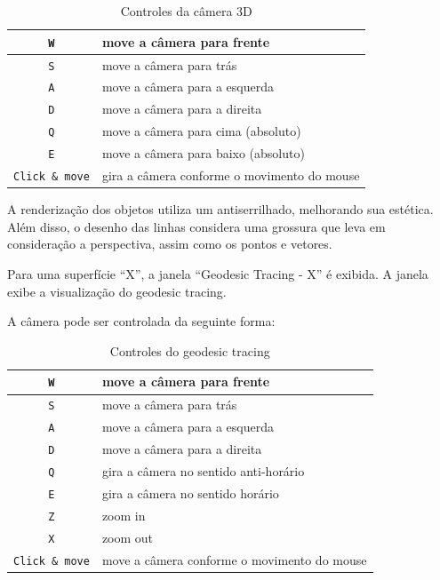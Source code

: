 \begin{table}[ht]
\caption{Controles da câmera 3D}
\label{camctrl}
\begin{centering}
\begin{tabularx}{\textwidth}{||c|X||}
    \hline
    \texttt{W} & move a câmera para frente \\
    \hline
    \texttt{S} & move a câmera para trás \\
    \hline
    \texttt{A} & move a câmera para a esquerda \\
    \hline
    \texttt{D} & move a câmera para a direita \\
    \hline
    \texttt{Q} & move a câmera para cima (absoluto) \\
    \hline
    \texttt{E} & move a câmera para baixo (absoluto) \\
    \hline
    \texttt{Click \& move} & gira a câmera conforme o movimento do mouse \\
    \hline
\end{tabularx}
\end{centering}
\end{table}

A renderização dos objetos utiliza um antiserrilhado, melhorando sua estética.
Além disso, o desenho das linhas considera uma grossura que leva
em consideração a perspectiva, assim como os pontos e vetores.

Para uma superfície ``X'', a janela ``Geodesic Tracing - X'' é exibida.
A janela exibe a visualização do geodesic tracing.

A câmera pode ser controlada da seguinte forma:

\begin{table}[ht]
\caption{Controles do geodesic tracing}
\label{gtctrl}
\begin{centering}
\begin{tabularx}{\textwidth}{||c|X||}
    \hline
    \texttt{W} & move a câmera para frente \\ 
    \hline
    \texttt{S} & move a câmera para trás \\
    \hline
    \texttt{A} & move a câmera para a esquerda \\
    \hline
    \texttt{D} & move a câmera para a direita \\
    \hline
    \texttt{Q} & gira a câmera no sentido anti-horário \\
    \hline
    \texttt{E} & gira a câmera no sentido horário \\
    \hline
    \texttt{Z} & zoom in \\
    \hline
    \texttt{X} & zoom out \\
    \hline
    \texttt{Click \& move} & move a câmera conforme o movimento do mouse \\
    \hline
\end{tabularx}
\end{centering}
\end{table}

